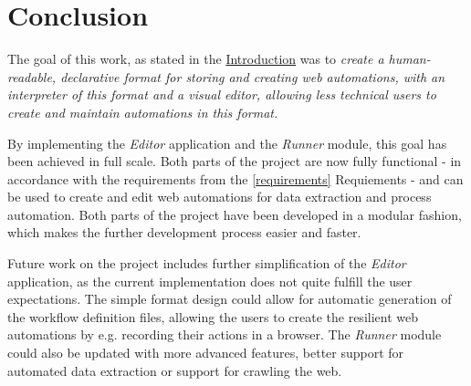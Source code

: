 \chapter{Conclusion}

The goal of this work, as stated in the \hyperref[intro]{Introduction} was to \textit{create a human-readable, declarative format for
storing and creating web automations, with an interpreter of this format and a
visual editor, allowing less technical users to create and maintain automations in
this format.}

By implementing the \textit{Editor} application and the \textit{Runner} module, this goal has been achieved in full scale.
Both parts of the project are now fully functional - in accordance with the requirements from the \autoref{requirements} Requiements - and can be used to create and edit web automations
for data extraction and process automation.
Both parts of the project have been developed in a modular fashion, which makes the further development process easier and faster.

Future work on the project includes further simplification of the \textit{Editor} application, as the current implementation does not quite fulfill the user expectations.
The simple format design could allow for automatic generation of the workflow definition files, allowing the users to create the resilient web automations by e.g. recording their actions in a browser. 
The \textit{Runner} module could also be updated with more advanced features, better support for automated data extraction or support for crawling the web.